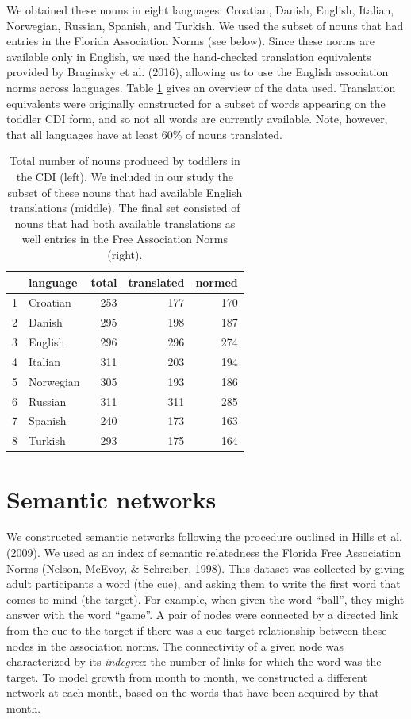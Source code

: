 \documentclass[english,floatsintext,man]{apa6}
\theoremstyle{definition}
\theoremstyle{definition}
\theoremstyle{definition}
\theoremstyle{remark}
\begin{document}
We obtained these nouns in eight languages: Croatian, Danish, English,
Italian, Norwegian, Russian, Spanish, and Turkish. We used the subset of
nouns that had entries in the Florida Association Norms (see below).
Since these norms are available only in English, we used the
hand-checked translation equivalents provided by Braginsky et al.
(2016), allowing us to use the English association norms across
languages. Table \ref{tab:stats} gives an overview of the data used.
Translation equivalents were originally constructed for a subset of
words appearing on the toddler CDI form, and so not all words are
currently available. Note, however, that all languages have at least
60\% of nouns translated.

\begin{table}[H]
\centering
\begin{tabular}{rlrrr}
  \hline
 & language & total & translated & normed \\ 
  \hline
1 & Croatian & 253 & 177 & 170 \\ 
  2 & Danish & 295 & 198 & 187 \\ 
  3 & English & 296 & 296 & 274 \\ 
  4 & Italian & 311 & 203 & 194 \\ 
  5 & Norwegian & 305 & 193 & 186 \\ 
  6 & Russian & 311 & 311 & 285 \\ 
  7 & Spanish & 240 & 173 & 163 \\ 
  8 & Turkish & 293 & 175 & 164 \\ 
   \hline
\end{tabular}
\caption{\label{tab:stats}Total number of nouns produced by toddlers in the CDI (left). We included in our study the subset of these nouns that had available English translations (middle). The final set consisted of nouns that had both available translations as well entries in the Free Association Norms (right).} 
\end{table}

\section{Semantic networks}\label{semantic-networks}

We constructed semantic networks following the procedure outlined in
Hills et al. (2009). We used as an index of semantic relatedness the
Florida Free Association Norms (Nelson, McEvoy, \& Schreiber, 1998).
This dataset was collected by giving adult participants a word (the
cue), and asking them to write the first word that comes to mind (the
target). For example, when given the word \enquote{ball}, they might
answer with the word \enquote{game}. A pair of nodes were connected by a
directed link from the cue to the target if there was a cue-target
relationship between these nodes in the association norms. The
connectivity of a given node was characterized by its \emph{indegree}:
the number of links for which the word was the target. To model growth
from month to month, we constructed a different network at each month,
based on the words that have been acquired by that month.
\end{document}
